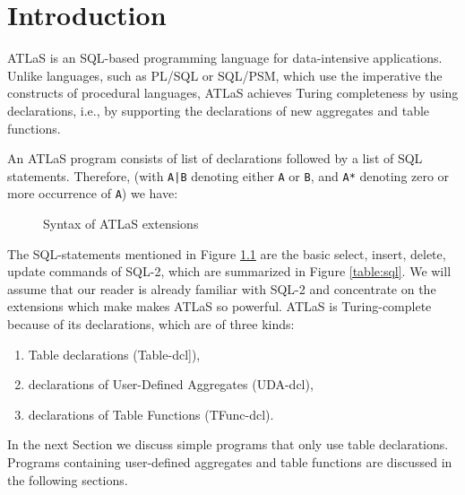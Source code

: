 

\chapter{Introduction}

ATLaS is an SQL-based programming language for data-intensive applications.
Unlike languages, such as PL/SQL  or SQL/PSM, which use the imperative the constructs of
procedural languages, ATLaS achieves Turing completeness by using declarations, i.e.,
by supporting the declarations of new  aggregates and table functions.

An ATLaS program consists of list of declarations followed by a list of
SQL statements. Therefore, (with
{\tt A|B} denoting either {\tt A} or {\tt B}, and {\tt A*}
denoting zero or more occurrence of {\tt A}) we have:
\begin{figure}[!htp]
\centering
{}
\caption{Syntax of ATLaS extensions \label{tab:syntax}}
\end{figure}


The SQL-statements  mentioned  in Figure \ref{tab:syntax}
are the  basic select, insert, delete, update commands of
SQL-2,  which are summarized in Figure \ref{table:sql}.
We will assume that our reader is  already familiar with SQL-2 and
concentrate on the extensions which make
makes ATLaS so powerful.  ATLaS is Turing-complete
because of its declarations,
which are of three kinds:

\begin{enumerate}
\item  Table declarations (Table-dcl]),

\item  declarations of User-Defined Aggregates (UDA-dcl),

\item  declarations of Table Functions (TFunc-dcl).
\end{enumerate}

In the next  Section  we discuss simple programs that only use table
declarations. Programs
containing user-defined aggregates and table functions are
discussed in  the following sections.
